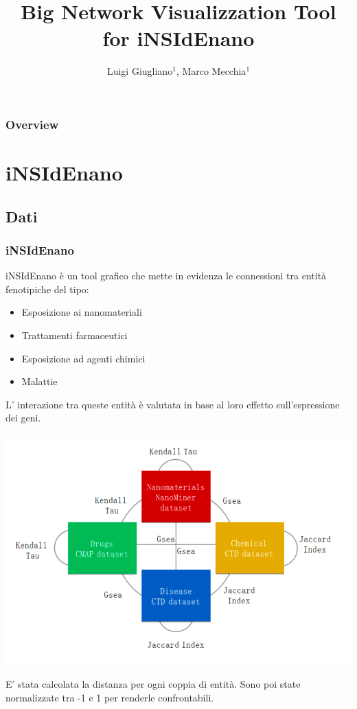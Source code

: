 \documentclass{beamer}
\title{Big Network Visualizzation Tool for iNSIdEnano}
\author{Luigi Giugliano$^1$, Marco Mecchia$^1$}
\institute{$^1$Universit\'a degli studi di Salerno}
\begin{document}
\begin{frame}
   \maketitle
\end{frame}

\begin{frame}
  \frametitle{Overview}
  \footnotesize \tableofcontents
\end{frame}



\section{iNSIdEnano}
\subsection{Dati}
\begin{frame}
\frametitle{iNSIdEnano}
iNSIdEnano è un tool grafico che mette in evidenza le connessioni tra entità fenotipiche del tipo:
\begin{itemize}
\item Esposizione ai nanomateriali
\item Trattamenti farmaceutici
\item Esposizione ad agenti chimici
\item Malattie
\end{itemize}
L' interazione tra queste entità è valutata in base al loro effetto sull'espressione dei geni.
\end{frame}

\begin{frame}
\begin{center}
\includegraphics[scale=0.27]{img/OverviewGraph.png}
\end{center}
E' stata calcolata la distanza per ogni coppia di entità. Sono poi state normalizzate tra -1 e 1 per renderle confrontabili.
\end{frame}
\end{document}
